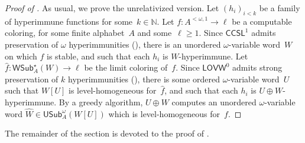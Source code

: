 \documentclass{article}
\newcommand{\RCA}[0]{\mathsf{RCA}}
\newcommand{\CCSL}[0]{\mathsf{CCSL}}
\newcommand{\SCSL}[0]{\mathsf{SCSL}}
\newcommand{\CSL}[0]{\mathsf{CSL}}
\newcommand{\LOVW}[0]{\mathsf{LOVW}}
\newcommand{\LCSL}[0]{\mathsf{LCSL}}
\newcommand{\SLCSL}[0]{\mathsf{SLCSL}}
\newcommand{\NN}[0]{\mathbb{N}}
\newcommand{\USub}{\mathsf{USub}}
\newcommand{\WSub}{\mathsf{WSub}}
\numberwithin{theorem}{section}
\newtheorem{lemma}[theorem]{Lemma}
\theoremstyle{definition}
\begin{document}
\begin{proof}[Proof of ]
As usual, we prove the unrelativized version. Let $(h_i)_{i < k}$ be a family of hyperimmune functions for some~$k \in \NN$. Let $f : A^{<\omega, 1} \to \ell$ be a computable coloring, for some finite alphabet~$A$ and some~$\ell \geq 1$.
Since $\CCSL^1$ admits preservation of $\omega$ hyperimmunities (), there is an unordered $\omega$-variable word~$W$ on which $f$ is stable, and such that each $h_i$ is $W$-hyperimmune. Let $\hat f : \WSub^{\star}_A(W) \to \ell$ be the limit coloring of~$f$.
Since $\LOVW^0$ admits strong preservation of $k$ hyperimmunities (), there is some ordered $\omega$-variable word~$U$ such that $W[U]$ is level-homogeneous for~$\hat f$, and such that each $h_i$ is $U \oplus W$-hyperimmune. By a greedy algorithm, $U \oplus W$ computes an unordered $\omega$-variable word $\hat W \in \USub^\omega_A(W[U])$ which is level-homogeneous for~$f$.
\end{proof}

The remainder of the section is devoted to the proof of .



\end{document}
